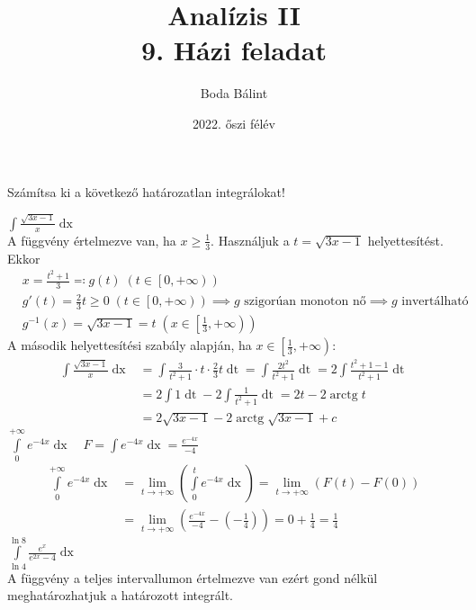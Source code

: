 \documentclass[a4paper,12pt]{article}
\title{\huge{Analízis II} \\ \large 9. Házi feladat}
\author{Boda Bálint}
\date{2022. őszi félév}
\theoremstyle{definition}
\DeclareMathOperator{\arctg}{arctg}
\begin{document}
	\maketitle
	\begin{question}
		Számítsa ki a következő határozatlan integrálokat!
		\begin{tasks}
			\task $ \displaystyle \int{\frac{\sqrt{3x-1}}{x} \mathop{dx}} $ \\[8pt]
			A függvény értelmezve van, ha $ x \ge \frac{1}{3} $. Használjuk a $ t = \sqrt{3x-1} $ helyettesítést. Ekkor
			\begin{align*}
				&x = \frac{t^2+1}{3} \eqcolon g(t) \; \left( t \in \left[ 0,+\infty \right)  \right) \\
				&g'(t) = \frac{2}{3}t \ge 0 \; \left( t \in \left[ 0,+\infty \right)  \right) \implies g \text{ szigorúan monoton nő} \implies g\text{ invertálható} \\
				&g^{-1}(x) = \sqrt{3x-1} = t \; \left( x \in \left[ \frac{1}{3}, +\infty \right)  \right)
			\end{align*}
			A második helyettesítési szabály alapján, ha $ x \in \left[ \frac{1}{3}, +\infty \right) $:
			\begin{align*}
				\int{\frac{\sqrt{3x-1}}{x} \mathop{dx}} &= \int{\frac{3}{t^2+1} \cdot t \cdot \frac{2}{3}t \mathop{dt}} = \int{\frac{2t^2}{t^2+1} \mathop{dt}} = 2 \int{\frac{t^2+1-1}{t^2+1} \mathop{dt}} \\
				&= 2 \int{1 \mathop{dt}} - 2\int{\frac{1}{t^2+1} \mathop{dt}} = 2t - 2\arctg{t} \\
				&= 2 \sqrt{3x-1} - 2\arctg{\sqrt{3x-1}} + c
			\end{align*}
			\task $ \displaystyle \int \limits_{0}^{+\infty}{e^{-4x} \mathop{dx}} \quad F = \displaystyle \int{e^{-4x} \mathop{dx}} = \frac{e^{-4x}}{-4} $
			\begin{align*}
				\int \limits_{0}^{+\infty}{e^{-4x} \mathop{dx}} &= \lim\limits_{t \rightarrow + \infty} \left( \int \limits_{0}^{t}{e^{-4x} \mathop{dx}} \right) = \lim\limits_{t \rightarrow + \infty} \left( F(t) - F(0) \right) \\
				&= \lim\limits_{t \rightarrow + \infty} \left( \frac{e^{-4x}}{-4} - \left( - \frac{1}{4} \right) \right) = 0 + \frac{1}{4} = \frac{1}{4}
			\end{align*}
			\task $ \displaystyle \int\limits_  {\ln 4}^{\ln 8}{\frac{e^x}{e^{2x}-4} \mathop{dx}}  $ \\[8pt]
			A függvény a teljes intervallumon értelmezve van ezért gond nélkül meghatározhatjuk a határozott integrált.

\end{tasks}
\end{question}
\end{document}
